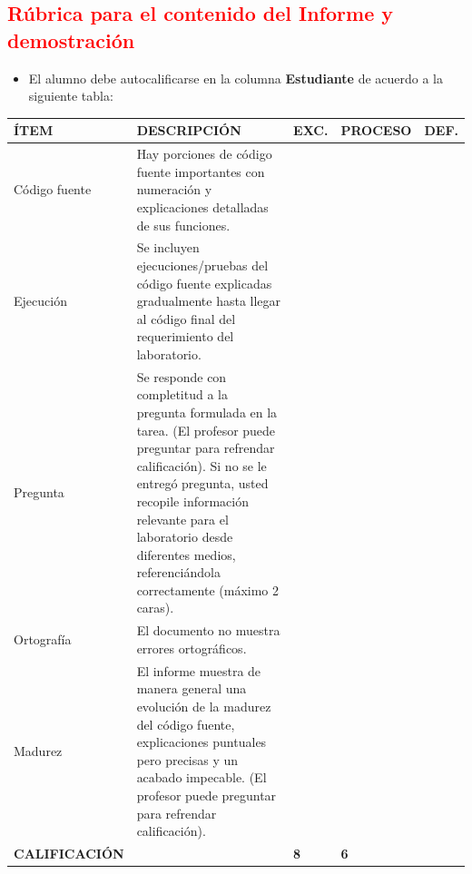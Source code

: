 \documentclass{article}
\begin{document}
	\clearpage
	
	\subsection{\textcolor{red}{Rúbrica para el contenido del Informe y demostración}}
	\begin{itemize}			

		\item El alumno debe autocalificarse en la columna \textbf{Estudiante} de acuerdo a la siguiente tabla:
	
	\end{itemize}
		
           \begin{center}
        \begin{table}[h!]
        \renewcommand{\arraystretch}{2}
        \begin{tabular}{|>{\centering\arraybackslash}m{3cm}|>{\arraybackslash}m{7cm}|>{\centering\arraybackslash}m{1cm}|>{\centering\arraybackslash}m{2cm}|>{\centering\arraybackslash}m{1cm}|}
        \hline
        \rowcolor[HTML]{D9EAD3} 
        \textbf{ÍTEM}      & \textbf{DESCRIPCIÓN} & \textbf{EXC.} & \textbf{PROCESO} & \textbf{DEF.} \\ \hline
        Código fuente      & Hay porciones de código fuente importantes con numeración y explicaciones detalladas de sus funciones. & 4 &  & \\ \hline
        Ejecución          & Se incluyen ejecuciones/pruebas del código fuente explicadas gradualmente hasta llegar al código final del requerimiento del laboratorio. & 4 &  &  \\ \hline
        Pregunta           & Se responde con completitud a la pregunta formulada en la tarea. (El profesor puede preguntar para refrendar calificación). Si no se le entregó pregunta, usted recopile información relevante para el laboratorio desde diferentes medios, referenciándola correctamente (máximo 2 caras). &  & 2 &  \\ \hline
        Ortografía         & El documento no muestra errores ortográficos. &  & 2 &  \\ \hline
        Madurez            & El informe muestra de manera general una evolución de la madurez del código fuente, explicaciones puntuales pero precisas y un acabado impecable. (El profesor puede preguntar para refrendar calificación). &  & 2 &  \\ \hline
        \rowcolor[HTML]{F4CCCC} 
        \textbf{CALIFICACIÓN} & & \textbf{8} & \textbf{6} & \textbf{} \\ \hline
        \end{tabular}
        \end{table}
        \end{center}
\end{document}
